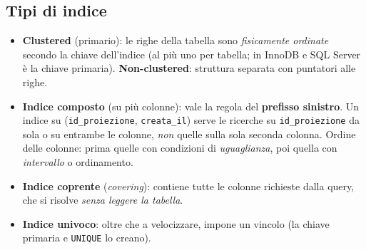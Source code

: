 \subsection{Tipi di indice}
\begin{itemize}
    \item \textbf{Clustered} (primario): le righe della tabella sono \emph{fisicamente ordinate} secondo la chiave dell'indice (al più uno per tabella; in InnoDB e SQL Server è la chiave primaria). \textbf{Non-clustered}: struttura separata con puntatori alle righe.
    \item \textbf{Indice composto} (su più colonne): vale la regola del \textbf{prefisso sinistro}. Un indice su (\texttt{id\_proiezione}, \texttt{creata\_il}) serve le ricerche su \texttt{id\_proiezione} da sola o su entrambe le colonne, \emph{non} quelle sulla sola seconda colonna. Ordine delle colonne: prima quelle con condizioni di \emph{uguaglianza}, poi quella con \emph{intervallo} o ordinamento.
    \item \textbf{Indice coprente} (\emph{covering}): contiene tutte le colonne richieste dalla query, che si risolve \emph{senza leggere la tabella}.
    \item \textbf{Indice univoco}: oltre che a velocizzare, impone un vincolo (la chiave primaria e \texttt{UNIQUE} lo creano).
\end{itemize}

